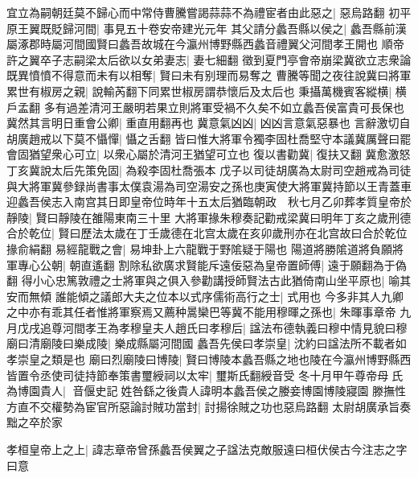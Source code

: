 宜立為嗣朝廷莫不歸心而中常侍曹騰嘗謁蒜蒜不為禮宦者由此惡之|{
	惡烏路翻}
初平原王翼既貶歸河間|{
	事見五十卷安帝建光元年}
其父請分蠡吾縣以侯之|{
	蠡吾縣前漢屬涿郡時屬河間國賢曰蠡吾故城在今瀛州博野縣西蠡音禮翼父河間孝王開也}
順帝許之翼卒子志嗣梁太后欲以女弟妻志|{
	妻七細翻}
徵到夏門亭會帝崩梁冀欲立志衆論既異憤憤不得意而未有以相奪|{
	賢曰未有别理而易奪之}
曹騰等聞之夜往說冀曰將軍累世有椒房之親|{
	說輸芮翻下同累世椒房謂恭懷后及太后也}
秉攝萬機賓客縱横|{
	横戶孟翻}
多有過差清河王嚴明若果立則將軍受禍不久矣不如立蠡吾侯富貴可長保也冀然其言明日重會公卿|{
	重直用翻再也}
冀意氣凶凶|{
	凶凶言意氣惡暴也}
言辭激切自胡廣趙戒以下莫不懾憚|{
	懾之舌翻}
皆曰惟大將軍令獨李固杜喬堅守本議冀厲聲曰罷會固猶望衆心可立|{
	以衆心屬於清河王猶望可立也}
復以書勸冀|{
	復扶又翻}
冀愈激怒丁亥冀說太后先策免固|{
	為殺李固杜喬張本}
戊子以司徒胡廣為太尉司空趙戒為司徒與大將軍冀參録尚書事太僕袁湯為司空湯安之孫也庚寅使大將軍冀持節以王青蓋車迎蠡吾侯志入南宫其日即皇帝位時年十五太后猶臨朝政　秋七月乙卯葬孝質皇帝於靜陵|{
	賢曰靜陵在雒陽東南三十里}
大將軍掾朱穆奏記勸戒梁冀曰明年丁亥之歲刑德合於乾位|{
	賢曰歷法太歲在丁壬歲德在北宫太歲在亥卯歲刑亦在北宫故曰合於乾位掾俞絹翻}
易經龍戰之會|{
	易坤卦上六龍戰于野隂疑于陽也}
陽道將勝隂道將負願將軍專心公朝|{
	朝直遙翻}
割除私欲廣求賢能斥遠佞惡為皇帝置師傅|{
	遠于願翻為于偽翻}
得小心忠篤敦禮之士將軍與之俱入參勸講授師賢法古此猶倚南山坐平原也|{
	喻其安而無傾}
誰能傾之議郎大夫之位本以式序儒術高行之士|{
	式用也}
今多非其人九卿之中亦有乖其任者惟將軍察焉又薦种暠欒巴等冀不能用穆暉之孫也|{
	朱暉事章帝}
九月戊戌追尊河間孝王為孝穆皇夫人趙氏曰孝穆后|{
	諡法布德執義曰穆中情見貌曰穆}
廟曰清廟陵曰樂成陵|{
	樂成縣屬河間國}
蠡吾先侯曰孝崇皇|{
	沈約曰諡法所不載者如孝崇皇之類是也}
廟曰烈廟陵曰博陵|{
	賢曰博陵本蠡吾縣之地也陵在今瀛州博野縣西}
皆置令丞使司徒持節奉策書璽綬祠以太牢|{
	璽斯氏翻綬音受}
冬十月甲午尊帝母氏為博園貴人|{
	音偃史記姓咎繇之後貴人諱明本蠡吾侯之媵妾博園博陵寢園}
滕撫性方直不交權勢為宦官所惡論討賊功當封|{
	討揚徐賊之功也惡烏路翻}
太尉胡廣承旨奏黜之卒於家

孝桓皇帝上之上|{
	諱志章帝曾孫蠡吾侯翼之子諡法克敵服遠曰桓伏侯古今注志之字曰意}


